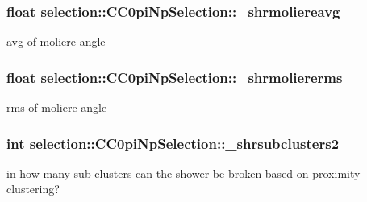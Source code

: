 \subsubsection[{\texorpdfstring{\+\_\+shrmoliereavg}{_shrmoliereavg}}]{\setlength{\rightskip}{0pt plus 5cm}float selection\+::\+C\+C0pi\+Np\+Selection\+::\+\_\+shrmoliereavg\hspace{0.3cm}{\ttfamily [private]}}\hypertarget{classselection_1_1CC0piNpSelection_a12991c5dfa675422d48f75a1caeae3ea}{}\label{classselection_1_1CC0piNpSelection_a12991c5dfa675422d48f75a1caeae3ea}
avg of moliere angle 
\subsubsection[{\texorpdfstring{\+\_\+shrmoliererms}{_shrmoliererms}}]{\setlength{\rightskip}{0pt plus 5cm}float selection\+::\+C\+C0pi\+Np\+Selection\+::\+\_\+shrmoliererms\hspace{0.3cm}{\ttfamily [private]}}\hypertarget{classselection_1_1CC0piNpSelection_a4fbd21a7fae1f01027cfe234e925c19a}{}\label{classselection_1_1CC0piNpSelection_a4fbd21a7fae1f01027cfe234e925c19a}
rms of moliere angle 
\subsubsection[{\texorpdfstring{\+\_\+shrsubclusters2}{_shrsubclusters2}}]{\setlength{\rightskip}{0pt plus 5cm}int selection\+::\+C\+C0pi\+Np\+Selection\+::\+\_\+shrsubclusters2\hspace{0.3cm}{\ttfamily [private]}}\hypertarget{classselection_1_1CC0piNpSelection_af7e0f3d1bd6c4335353bd8d4054d4e1e}{}\label{classselection_1_1CC0piNpSelection_af7e0f3d1bd6c4335353bd8d4054d4e1e}
in how many sub-\/clusters can the shower be broken based on proximity clustering? 

